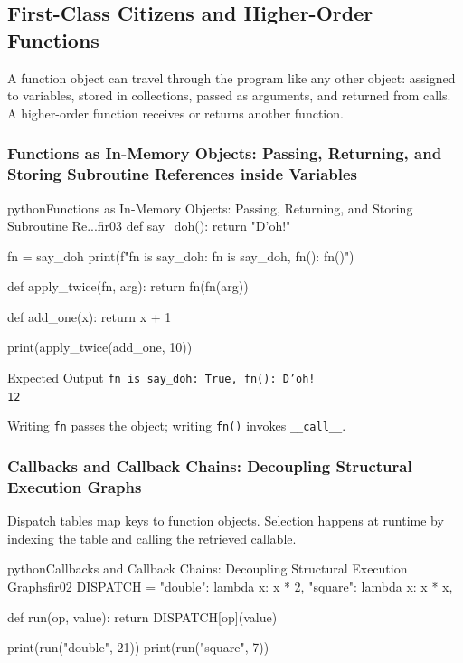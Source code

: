 \subsection{First-Class Citizens and Higher-Order Functions}

A function object can travel through the program like any other object: assigned to variables, stored in collections, passed as arguments, and returned from calls. A higher-order function receives or returns another function.

\subsubsection{Functions as In-Memory Objects: Passing, Returning, and Storing Subroutine References inside Variables}

\begin{codebox}[]{python}{Functions as In-Memory Objects: Passing, Returning, and Storing Subroutine Re...}{fir03}
def say_doh():
    return "D'oh!"

fn = say_doh
print(f"fn is say_doh: {fn is say_doh}, fn(): {fn()}")

def apply_twice(fn, arg):
    return fn(fn(arg))

def add_one(x):
    return x + 1

print(apply_twice(add_one, 10))
\end{codebox}


\begin{iobox}{Expected Output}
\texttt{fn is say\_doh: True, fn(): D'oh!} \\
\texttt{12} \\
\end{iobox}




Writing \texttt{fn} passes the object; writing \texttt{fn()} invokes \texttt{\_\_call\_\_}.

\subsubsection{Callbacks and Callback Chains: Decoupling Structural Execution Graphs}

Dispatch tables map keys to function objects. Selection happens at runtime by indexing the table and calling the retrieved callable.

\begin{codebox}[]{python}{Callbacks and Callback Chains: Decoupling Structural Execution Graphs}{fir02}
DISPATCH = {
    "double": lambda x: x * 2,
    "square": lambda x: x * x,
}

def run(op, value):
    return DISPATCH[op](value)

print(run("double", 21))
print(run("square", 7))
\end{codebox}


